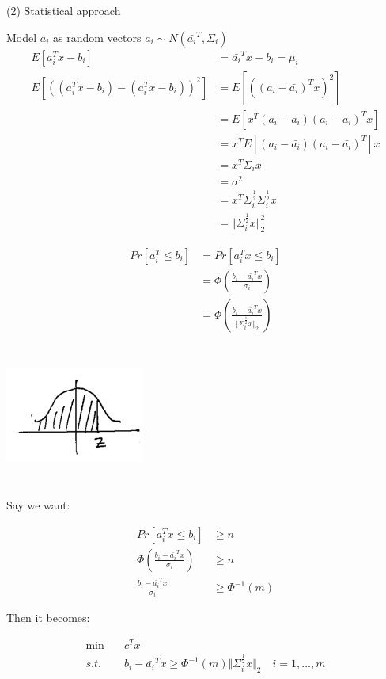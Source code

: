 (2) Statistical approach

Model $a_i$ as random vectors $a_i \sim N(\bar{a_i}^T, \Sigma_i)$
\begin{align*}
E[a_i^Tx - b_i] &= \bar{a_i}^Tx - b_i = \mu_i\\
E[((a_i^Tx - b_i) - (a_i^Tx - b_i))^2] &= E[((a_i - \bar{a_i})^Tx)^2]\\
&= E[x^T(a_i - \bar{a_i})(a_i - \bar{a_i})^Tx] \\
&= x^TE[(a_i - \bar{a_i})(a_i - \bar{a_i})^T]x\\
&= x^T\Sigma_i x \\
&= \sigma^2\\
&= x^T \Sigma_i^{\frac{1}{2}}\Sigma_i^{\frac{1}{2}} x\\
&= \Vert \Sigma_i^{\frac{1}{2}} x\Vert^2_2
\end{align*}

\begin{align*}
Pr[a_i^T \leq b_i] &= Pr[a^T_i x\leq b_i]\\
&= \Phi(\frac{b_i - \bar{a_i}^Tx}{\sigma_i})\\
&= \Phi(\frac{b_i - \bar{a_i}^Tx}{\Vert \Sigma_i^{\frac{1}{2}} x\Vert_2})
\end{align*}

\begin{marginfigure}
\centering
\includegraphics[width=1.8in,height=1.8in]{figures/ch09/figure1118_2.png}
\end{marginfigure}

Say we want:

\begin{align*}
Pr[a_i^Tx\leq b_i]&\geq n\\
\Phi(\frac{b_i - \bar{a_i}^Tx}{\sigma_i})&\geq n\\
\frac{b_i - \bar{a_i}^Tx}{\sigma_i}&\geq \Phi^{-1}(m)
\end{align*}

Then it becomes:

\begin{align*}
\min \quad& c^Tx \\
s.t. \quad& b_i - \bar{a_i}^Tx\geq \Phi^{-1}(m)\Vert\Sigma_i^{\frac{1}{2}}x\Vert_2 \quad i = 1,...,m
\end{align*}

